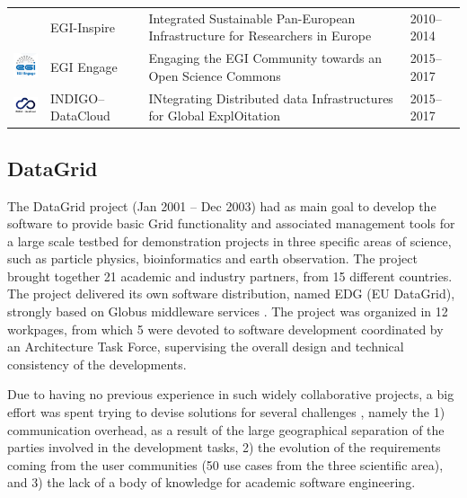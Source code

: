 \documentclass[journal]{IEEEtran}
\begin{document}
\begin{table}[!h]
\begin{tabular}{p{1.6cm}p{1.5cm}p{3cm}l}
\begin{minipage}{.3\textwidth}
\end{minipage}
     & EGI-Inspire &
Integrated Sustainable Pan-European Infrastructure for Researchers in Europe
 & 2010--2014\\
\begin{minipage}{.3\textwidth}
\includegraphics[width=15mm,height=7.5mm]{images/egi_engage}
\end{minipage}
     & EGI Engage &
Engaging the EGI Community towards an Open Science Commons
 & 2015--2017\\
\begin{minipage}{.3\textwidth}
\includegraphics[width=15mm,height=7.5mm]{images/indigo}
\end{minipage}
     & INDIGO--DataCloud &
INtegrating Distributed data Infrastructures for Global ExplOitation
 & 2015--2017\\
\hline
\hline
\end{tabular}
\end{table}

\subsection{DataGrid}

The DataGrid \cite{cordis:datagrid} project (Jan 2001 -- Dec 2003) 
had as main goal to develop the software to provide basic Grid functionality
and associated management tools for a large scale testbed for demonstration projects in three
specific areas of science, such as particle physics, bioinformatics and earth observation.
The project brought together 21 academic and industry partners, from 15 different
countries. 
The project delivered its own software distribution, named EDG (EU DataGrid), strongly 
based on Globus middleware services \cite{globus}. The project was organized in 12 workpages, from 
which 5 were devoted to software development coordinated by an 
Architecture Task Force, supervising the overall design and technical consistency 
of the developments.

Due to having no previous experience in such widely
collaborative projects, a big effort was spent trying to devise solutions for several
challenges \cite{datagrid}, namely the 1) communication overhead, as a
result of the large geographical separation of the parties involved in the
development tasks, 2) the evolution of the requirements coming from the user
communities (50 use cases from the three scientific area), and 3) the lack of a body 
of knowledge for academic software engineering.
\end{document}
